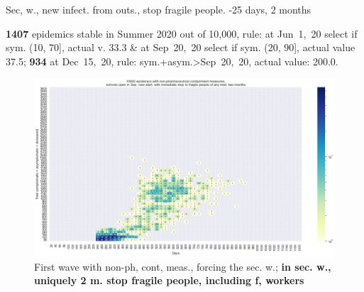\documentclass[8pt]{beamer}
\begin{document}
\begin{frame}{Sec, w., new infect. from outs., stop fragile people. -25 days, 2 months}


\textbf{1407} {\tiny epidemics stable in Summer 2020 out of 10,000, rule: at Jun~1,~20 select if sym. (10, 70], actual v. 33.3 \& at Sep~20,~20 select if sym. (20, 90], actual value 37.5;} \textbf{934} {\tiny at Dec~15,~20, rule: sym.+asym.>Sep~20,~20, actual value: 200.0.}

\begin{figure}[H]
\center
\includegraphics[scale=0.17]{10kForceWave2NoFrag60-25.png}
\caption{First wave with non-ph, cont, meas., forcing the sec. w.; \textbf{in sec. w., uniquely 2 m. stop fragile people, including f, workers}} 
\label{selForceWave2NoFrag60-25}
\end{figure}



\end{frame}
\end{document}
